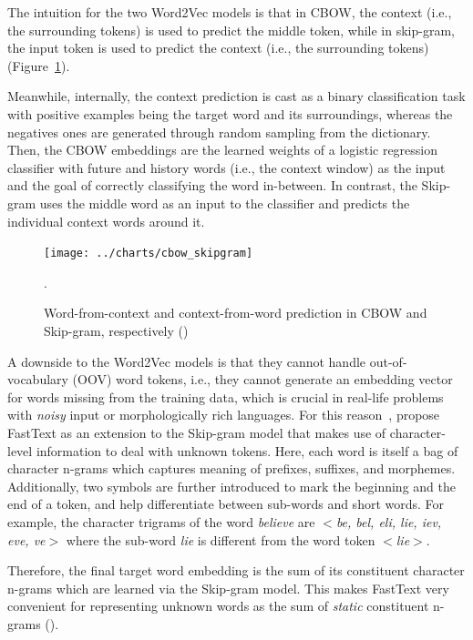 The intuition for the two Word2Vec models is that in CBOW, the context (i.e., the surrounding tokens) is used to predict the middle token, while in skip-gram, the input token is used to predict the context (i.e., the surrounding tokens) (Figure~\ref{fig:cbow_skipgram}).

Meanwhile, internally, the context prediction is cast as a binary classification task with positive examples being the target word and its surroundings, whereas the negatives ones are generated through random sampling from the dictionary. 
Then, the CBOW embeddings are the learned weights of a logistic regression classifier with future and history words (i.e., the context window) as the input and the goal of correctly classifying the word in-between. 
In contrast, the Skip-gram uses the middle word as an input to the classifier and predicts the individual context words around it.

\begin{figure}[ht]
    \centering
    \texttt{[image: ../charts/cbow\_skipgram]}~\caption{Word-from-context and context-from-word prediction in CBOW and Skip-gram, respectively (\cite{mikolov2013efficient})}.
    \label{fig:cbow_skipgram}
\end{figure}

A downside to the Word2Vec models is that they cannot handle out-of-vocabulary (OOV) word tokens, i.e., they cannot generate an embedding vector for words missing from the training data, which is crucial in real-life problems with \emph{noisy} input or morphologically rich languages.
For this reason~\cite{bojanowski-etal-2017-enriching}, propose FastText as an extension to the Skip-gram model that makes use of character-level information to deal with unknown tokens.
Here, each word is itself a bag of character n-grams which captures meaning of prefixes, suffixes, and morphemes. 
Additionally, two symbols are further introduced to mark the beginning and the end of a token, and help differentiate between sub-words and short words.
For example, the character trigrams of the word \emph{believe} are \emph{$<$be, bel, eli, lie, iev, eve, ve$>$} where the sub-word \emph{lie} is different from the word token \emph{$<$lie$>$}.

Therefore, the final target word embedding is the sum of its constituent character n-grams which are learned via the Skip-gram model.
This makes FastText very convenient for representing unknown words as the sum of \emph{static} constituent n-grams (\cite{jurafsky2000}).

